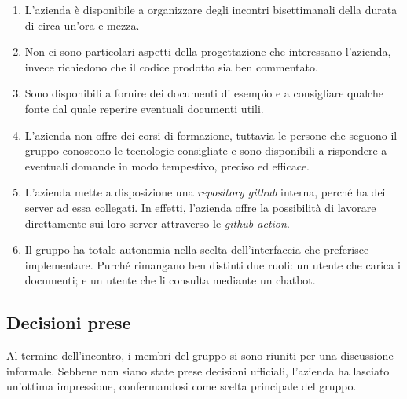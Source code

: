 \begin{enumerate}
	\item L'azienda è disponibile a organizzare degli incontri bisettimanali
		della durata di circa un'ora e mezza.

	\item Non ci sono particolari aspetti della progettazione che interessano
		l'azienda, invece richiedono che il codice prodotto sia ben
		commentato.

	\item Sono disponibili a fornire dei documenti di esempio e a consigliare
		qualche fonte dal quale reperire eventuali documenti utili.

	\item L'azienda non offre dei corsi di formazione, tuttavia le persone che
		seguono il gruppo conoscono le tecnologie consigliate e sono disponibili
		a rispondere a eventuali domande in modo tempestivo, preciso ed
		efficace.

	\item L'azienda mette a disposizione una \textit{repository github} interna, 
		perché ha dei server ad essa collegati. In effetti, l'azienda offre la
		possibilità di lavorare direttamente sui loro server attraverso le
		\textit{github action}.

	\item Il gruppo ha totale autonomia nella scelta dell'interfaccia che
		preferisce implementare. Purché rimangano ben distinti due ruoli: 
		un utente che carica i documenti; e un utente che li consulta mediante un
		chatbot.
\end{enumerate}

\subsection{Decisioni prese}
Al termine dell'incontro, i membri del gruppo si sono riuniti per una 
discussione informale. Sebbene non siano state prese decisioni ufficiali, 
l'azienda ha lasciato un'ottima impressione, confermandosi come scelta
principale del gruppo.
